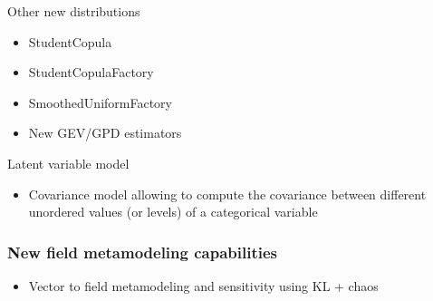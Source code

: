 \documentclass[aspectratio=169]{beamer}
\begin{document}

\begin{frame}{Other new distributions}
\begin{itemize}
\item StudentCopula
\item StudentCopulaFactory
\item SmoothedUniformFactory
\item New GEV/GPD estimators
\end{itemize}
\end{frame}



\begin{frame}{Latent variable model}

\begin{itemize}
\item Covariance model allowing to compute the covariance between different unordered values (or levels) of a categorical variable
\end{itemize}


\end{frame}


\begin{frame}
\frametitle{New field metamodeling capabilities}
\begin{itemize}
\item Vector to field metamodeling and sensitivity using KL + chaos
\end{itemize}

\end{frame}
\end{document}
